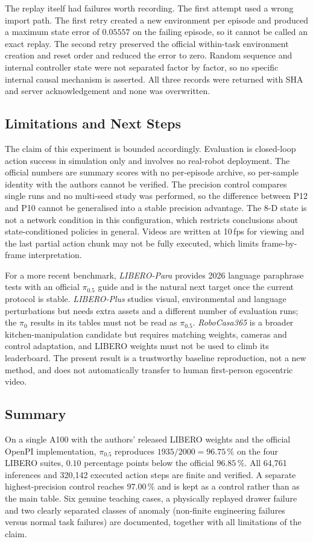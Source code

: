 The replay itself had failures worth recording. The first attempt used a wrong
import path. The first retry created a new environment per episode and produced
a maximum state error of $0.05557$ on the failing episode, so it cannot be
called an exact replay. The second retry preserved the official within-task
environment creation and reset order and reduced the error to zero. Random
sequence and internal controller state were not separated factor by factor, so
no specific internal causal mechanism is asserted. All three records were
returned with SHA and server acknowledgement and none was overwritten.

\subsection{Limitations and Next Steps}
\label{sec:pi05-limitations}

The claim of this experiment is bounded accordingly. Evaluation is closed-loop
action success in simulation only and involves no real-robot deployment. The
official numbers are summary scores with no per-episode archive, so per-sample
identity with the authors cannot be verified. The precision control compares
single runs and no multi-seed study was performed, so the difference between
P12 and P10 cannot be generalised into a stable precision advantage. The 8-D
state is not a network condition in this configuration, which restricts
conclusions about state-conditioned policies in general. Videos are written at
10\,fps for viewing and the last partial action chunk may not be fully
executed, which limits frame-by-frame interpretation.

For a more recent benchmark, \emph{LIBERO-Para} provides 2026 language
paraphrase tests with an official $\pi_{0.5}$ guide and is the natural next
target once the current protocol is stable. \emph{LIBERO-Plus} studies visual,
environmental and language perturbations but needs extra assets and a different
number of evaluation runs; the $\pi_0$ results in its tables must not be read as
$\pi_{0.5}$. \emph{RoboCasa365} is a broader kitchen-manipulation candidate but
requires matching weights, cameras and control adaptation, and LIBERO weights
must not be used to climb its leaderboard. The present result is a trustworthy
baseline reproduction, not a new method, and does not automatically transfer to
human first-person egocentric video.

\subsection{Summary}
\label{sec:pi05-summary}

On a single A100 with the authors' released LIBERO weights and the official
OpenPI implementation, $\pi_{0.5}$ reproduces $1935/2000 = 96.75\,\%$ on the
four LIBERO suites, $0.10$ percentage points below the official $96.85\,\%$.
All 64{,}761 inferences and 320{,}142 executed action steps are finite and
verified. A separate highest-precision control reaches $97.00\,\%$ and is kept
as a control rather than as the main table. Six genuine teaching cases, a
physically replayed drawer failure and two clearly separated classes of anomaly
(non-finite engineering failures versus normal task failures) are documented,
together with all limitations of the claim.
